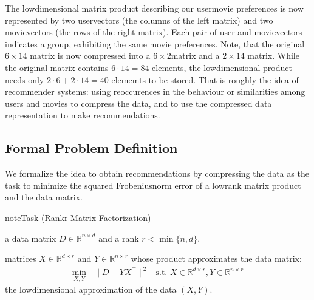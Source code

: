 \documentclass[letterpaper,10pt,english]{jupyterBook}
\begin{document}
The low\sphinxhyphen{}dimensional matrix product describing our user\sphinxhyphen{}movie preferences is now represented by two user\sphinxhyphen{}vectors (the columns of the left matrix) and two movie\sphinxhyphen{}vectors (the rows of the right matrix). Each pair of user\sphinxhyphen{} and movie\sphinxhyphen{}vectors indicates a group, exhibiting the same movie preferences. Note, that the original \(6\times 14\) matrix is now compressed into a \(6\times 2\)\sphinxhyphen{}matrix and a \(2\times 14\) matrix. While the original matrix contains \(6\cdot 14 = 84\) elements, the low\sphinxhyphen{}dimensional product needs only \(2\cdot 6 + 2\cdot 14 = 40\) elememts to be stored. That is roughly the idea of recommender systems: using reoccurences in the behaviour or similarities among users and movies to compress the data, and to use the compressed data representation to make recommendations.


\subsection{Formal Problem Definition}
\label{\detokenize{dim_reduction_mf:formal-problem-definition}}
\sphinxAtStartPar
We formalize the idea to obtain recommendations by compressing the data as the task to minimize the squared Frobenius\sphinxhyphen{}norm error of a low\sphinxhyphen{}rank matrix product and the data matrix.

\begin{sphinxadmonition}{note}{Task (Rank\sphinxhyphen{}r Matrix Factorization)}

\sphinxAtStartPar
{} a data matrix \(D\in\mathbb{R}^{n\times d}\) and a rank \(r<\min\{n,d\}\).

\sphinxAtStartPar
{} matrices \(X\in \mathbb{R}^{d\times r}\) and \(Y\in\mathbb{R}^{n\times r}\) whose product approximates the data matrix:
\label{equation:dim_reduction_mf:97aa8146-b858-496a-923c-451db5f70bb4}\begin{align}
    \min_{X,Y}&\lVert D- YX^\top\rVert^2 & \text{s.t. } X\in \mathbb{R}^{d\times r}, Y\in\mathbb{R}^{n\times r}
\end{align}
\sphinxAtStartPar
{} the low\sphinxhyphen{}dimensional approximation of the data \((X,Y)\).
\end{sphinxadmonition}
\end{document}
